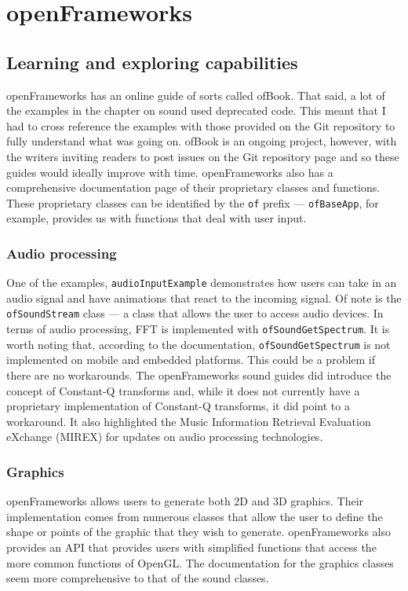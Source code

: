 \documentclass[../main_frameworkreview.tex]{subfiles}
\begin{document}
\section{openFrameworks}

\subsection{Learning and exploring capabilities}
openFrameworks has an online guide of sorts called ofBook. That said, a lot of the examples in the chapter on sound used deprecated code.\cite{Carlucci} This meant that I had to cross reference the examples with those provided on the Git repository to fully understand what was going on. ofBook is an ongoing project, however, with the writers inviting readers to post issues on the Git repository page and so these guides would ideally improve with time. openFrameworks also has a comprehensive documentation page of their proprietary classes and functions. These proprietary classes can be identified by the \verb|of| prefix --- \verb|ofBaseApp|, for example, provides us with functions that deal with user input.
\subsubsection{Audio processing}
One of the examples, \verb|audioInputExample| demonstrates how users can take in an audio signal and have animations that react to the incoming signal. Of note is the \verb|ofSoundStream| class --- a class that allows the user to access audio devices. In terms of audio processing, FFT is implemented with \verb|ofSoundGetSpectrum|. It is worth noting that, according to the documentation, \verb|ofSoundGetSpectrum| is not implemented on mobile and embedded platforms.\cite{OFsoundstreamFFT} This could be a problem if there are no workarounds. The openFrameworks sound guides did introduce the concept of Constant-Q transforms and, while it does not currently have a proprietary implementation of Constant-Q transforms, it did point to a workaround.\cite{Klapuri} It also highlighted the Music Information Retrieval Evaluation eXchange (MIREX) for updates on audio processing technologies.\cite{mirexWiki}
\subsubsection{Graphics}
openFrameworks allows users to generate both 2D and 3D graphics. Their implementation comes from numerous classes that allow the user to define the shape or points of the graphic that they wish to generate. openFrameworks also provides an API that provides users with simplified functions that access the more common functions of OpenGL. The documentation for the graphics classes seem more comprehensive to that of the sound classes.
\end{document}
